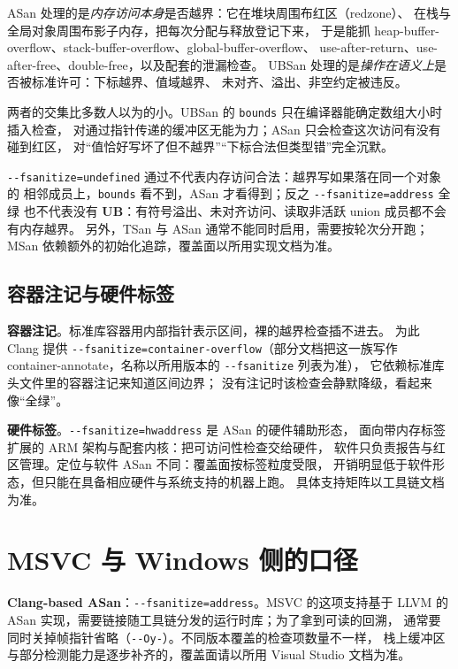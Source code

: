 \documentclass[12pt,a4paper,fontset=fandol]{ctexbook}
\newcommand{\Tp}[1]{\texttt{#1}}
\newcommand{\Opt}[1]{\texttt{-\/-#1}}
\newcommand{\UB}{\textbf{\textsf{UB}}}
\begin{document}
ASan 处理的是\emph{内存访问本身}是否越界：它在堆块周围布红区（redzone）、
在栈与全局对象周围布影子内存，把每次分配与释放登记下来，
于是能抓 heap-buffer-overflow、stack-buffer-overflow、global-buffer-overflow、
use-after-return、use-after-free、double-free，以及配套的泄漏检查。
UBSan 处理的是\emph{操作在语义上}是否被标准许可：下标越界、值域越界、
未对齐、溢出、非空约定被违反。

两者的交集比多数人以为的小。UBSan 的 \Tp{bounds} 只在编译器能确定数组大小时插入检查，
对通过指针传递的缓冲区无能为力；ASan 只会检查这次访问有没有碰到红区，
对“值恰好写坏了但不越界”“下标合法但类型错”完全沉默。

\begin{warning}[title={两个开关不能互相顶替}]
\Opt{fsanitize=undefined} 通过不代表内存访问合法：越界写如果落在同一个对象的
相邻成员上，\Tp{bounds} 看不到，ASan 才看得到；反之 \Opt{fsanitize=address} 全绿
也不代表没有 \UB{}：有符号溢出、未对齐访问、读取非活跃 union 成员都不会有内存越界。
另外，TSan 与 ASan 通常不能同时启用，需要按轮次分开跑；
MSan 依赖额外的初始化追踪，覆盖面以所用实现文档为准。
\end{warning}

\subsection{容器注记与硬件标签}\label{sec:ub03-container-hw}

\textbf{容器注记}。标准库容器用内部指针表示区间，裸的越界检查插不进去。
为此 Clang 提供 \Opt{fsanitize=container-overflow}（部分文档把这一族写作
container-annotate，名称以所用版本的 \Opt{fsanitize} 列表为准），
它依赖标准库头文件里的容器注记来知道区间边界；
没有注记时该检查会静默降级，看起来像“全绿”。

\textbf{硬件标签}。\Opt{fsanitize=hwaddress} 是 ASan 的硬件辅助形态，
面向带内存标签扩展的 ARM 架构与配套内核：把可访问性检查交给硬件，
软件只负责报告与红区管理。定位与软件 ASan 不同：覆盖面按标签粒度受限，
开销明显低于软件形态，但只能在具备相应硬件与系统支持的机器上跑。
具体支持矩阵以工具链文档为准。

\section{MSVC 与 Windows 侧的口径}\label{sec:ub03-msvc}

\textbf{Clang-based ASan}：\Opt{fsanitize=address}。MSVC 的这项支持基于
LLVM 的 ASan 实现，需要链接随工具链分发的运行时库；为了拿到可读的回溯，
通常要同时关掉帧指针省略（\Opt{Oy-}）。不同版本覆盖的检查项数量不一样，
栈上缓冲区与部分检测能力是逐步补齐的，覆盖面请以所用 Visual Studio 文档为准。
\end{document}
